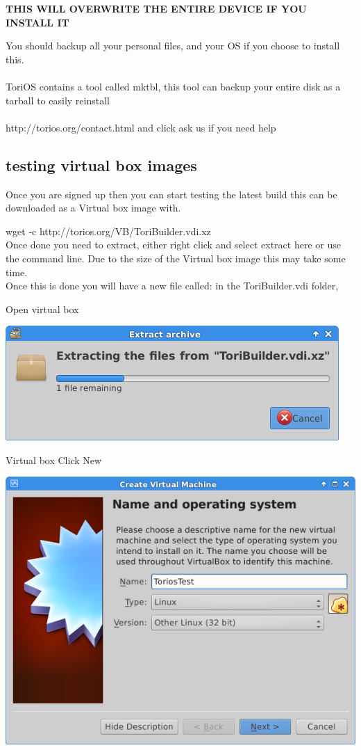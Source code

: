\documentclass[12pt,a4paper]{book}
\begin{document}
\begin{center}

\textbf{THIS WILL OVERWRITE THE ENTIRE DEVICE IF YOU 
INSTALL IT} \\

\end{center}

You should backup all your  personal files, and your OS if you choose to install this.\\ \\
ToriOS contains a tool called mktbl, this tool can backup your entire disk as a tarball to easily reinstall \\ \\
http://torios.org/contact.html and click ask us if you need help \\
 
\newpage

\subsection {testing virtual box images}
Once you are signed up then you can start testing the latest build this can be downloaded as a Virtual box image with.

wget -c http://torios.org/VB/ToriBuilder.vdi.xz \\

Once done you need to extract,   either right click and select extract here or use the command line.  Due to the size of the Virtual box image this may take some time. \\

Once this is done you will have a new file called:    in the ToriBuilder.vdi folder,  


Open virtual box

\begin{center}
\includegraphics[width=0.7\linewidth]{extractVBimage}
\end{center}

Virtual box 
Click New

\begin{center}
\item \includegraphics[width=0.7\linewidth]{ToriosTest01}
\end{center}
\end{document}

